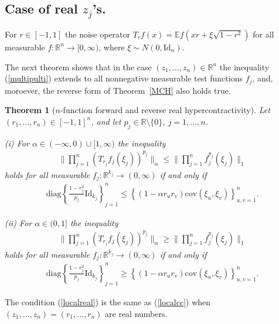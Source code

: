 \documentclass[9pt, a4paper]{amsart}
\newcommand{\1}{{\chi_{}}}%
\newtheorem{theorem}{Theorem}
\numberwithin{equation}{section}
\begin{document}
\subsection{Case of real $z_{j}$'s.}
For $r \in [-1,1]$ the noise operator $T_{r}f(x) = \mathbb{E}f(x r + \xi \sqrt{1-r^{2}})$ for all measurable $f :\mathbb{R}^{n} \to [0, \infty)$,  where $\xi \sim N(0, \mathrm{Id}_{n})$. 


The next theorem shows that in the case  $(z_{1}, \ldots, z_{n}) \in \mathbb{R}^{n}$ the inequality (\ref{multipulti}) extends to all nonnegative measurable test functions $f_{j}$, and, moroever, the reverse form of Theorem~\ref{MCH} also holds true. 
\begin{theorem}[$n$-function forward and reverse  real hypercontractivity]\label{MRH}
Let $(r_{1}, \ldots, r_{n})\in [-1,1]^{n}$, and let $p_{j} \in \mathbb{R} \setminus \{0\}$, $j=1, \ldots, n$.  

\textup{(i)}
For $\alpha \in (-\infty, 0)\cup [1, \infty)$ the inequality 
 \begin{align}\label{multipultir}
 \| \prod_{j=1}^{n} (T_{r_{j}}f_{j}(\xi_{j}))^{p_{j}}\|_{\alpha} \leq \|  \prod_{j=1}^{n} f^{p_{j}}_{j}(\xi_{j})\|_{1}
 \end{align}
 holds for all measurable $f_{j} : \mathbb{R}^{k_{j}} \to (0, \infty)$ if and only if
 \begin{align}\label{localreal}
     \mathrm{diag}\left\{ \frac{1-r_{j}^{2}}{p_{j}  } \mathrm{Id}_{k_{j}}\right\}_{j=1}^{n} \leq \left\{(1-\alpha r_{u}r_{v})\mathrm{cov}(\xi_{u}, \xi_{v})\right\}_{u,v=1}^{n}.
 \end{align}

 \textup{(ii)} For $\alpha \in (0,1]$ the inequality 
 \begin{align}\label{multipultirrev}
 \| \prod_{j=1}^{n} (T_{r_{j}}f_{j}(\xi_{j}))^{p_{j}}\|_{\alpha} \geq \|  \prod_{j=1}^{n} f^{p_{j}}_{j}(\xi_{j})\|_{1}
 \end{align}
  holds for all measurable $f_{j} : \mathbb{R}^{k_{j}} \to (0, \infty)$ if and only if
 \begin{align}\label{localrealrev}
     \mathrm{diag}\left\{ \frac{1-r_{j}^{2}}{p_{j}} \mathrm{Id}_{k_{j}}\right\}_{j=1}^{n} \geq \left\{(1-\alpha r_{u}r_{v})\mathrm{cov}(\xi_{u}, \xi_{v})\right\}_{u,v=1}^{n}.
 \end{align}
\end{theorem}

The condition (\ref{localreal}) is the  same as (\ref{localcc}) when $(z_{1}, \ldots, z_{n})=(r_{1}, \ldots, r_{n})$ are real numbers.
\end{document}
